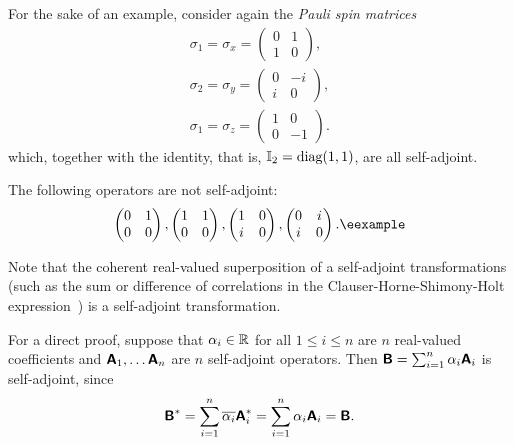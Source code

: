 {\color{blue}
\bexample
For the sake of an example, consider again the
{\em Pauli spin matrices}
\begin{equation}
\begin{split}
\sigma_1=\sigma_x=
\begin{pmatrix}
0&1\\
1&0
\end{pmatrix}
,   \\
\sigma_2=\sigma_y=
\begin{pmatrix}
0&-i\\
i&0
\end{pmatrix}
,   \\
\sigma_1=\sigma_z=
\begin{pmatrix}
1&0\\
0&-1
\end{pmatrix}
.
\end{split}
\end{equation}
which, together with the identity, that is, ${\Bbb I}_2=\textrm{diag}(1,1)$,  are all self-adjoint.

The following operators are not self-adjoint:
\begin{equation}
\begin{pmatrix}
0&1\\
0&0
\end{pmatrix}
 ,
\begin{pmatrix}
1&1\\
0&0
\end{pmatrix}
,
\begin{pmatrix}
1&0\\
i&0
\end{pmatrix}
,
\begin{pmatrix}
0&i\\
i&0
\end{pmatrix}
.{\textrm{\eexample}}
\end{equation}
%
}

Note that the coherent real-valued superposition
of a self-adjoint transformations
(such as the sum or difference of correlations in
the Clauser-Horne-Shimony-Holt expression~\cite{filipp-svo-04-qpoly-prl})
is a self-adjoint transformation.

{\color{OliveGreen}\bproof
For a direct proof,
suppose that $\alpha_i \in {\Bbb R}$ for all $1\le i \le n$ are $n$ real-valued coefficients and
$\textsf{\textbf{A}}_1, \ldots \textsf{\textbf{A}}_n$ are $n$ self-adjoint operators.
Then
$\textsf{\textbf{B}} = \sum_{i=1}^n \alpha_i \textsf{\textbf{A}}_i$
is self-adjoint, since
\begin{equation}
\textsf{\textbf{B}}^* = \sum_{i=1}^n \overline{\alpha_i} \textsf{\textbf{A}}_i^* = \sum_{i=1}^n  \alpha_i  \textsf{\textbf{A}}_i
=\textsf{\textbf{B}}
.
\end{equation}
\eproof
}


